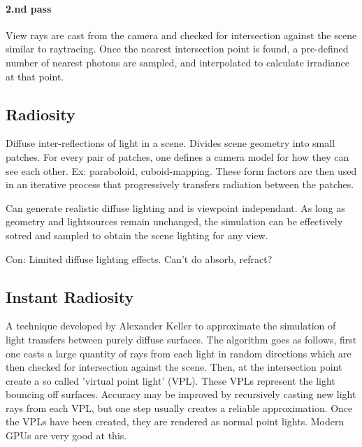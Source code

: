 		\paragraph{2.nd pass} View rays are cast from the camera and checked for intersection against the scene similar to raytracing. Once the nearest intersection point is found, a pre-defined number of nearest photons are sampled, and interpolated to calculate irradiance at that point.

	\subsection {Radiosity}
		Diffuse inter-reflections of light in a scene. Divides scene geometry into small
		patches. For every pair of patches, one defines a camera model for how they can
		see each other. Ex: paraboloid, cuboid-mapping. These form factors are then used
		in an iterative process that progressively transfers radiation between the
		patches.

		Can generate realistic diffuse lighting and is viewpoint independant. As long as
		geometry and lightsources remain unchanged, the simulation can be effectively
		sotred and sampled to obtain the scene lighting for any view.

		Con: Limited diffuse lighting effects. Can't do absorb, refract?

	\subsection {Instant Radiosity}
		A technique developed by Alexander Keller to approximate the simulation of light
		transfers between purely diffuse surfaces. The algorithm goes as follows, first
		one casts a large quantity of rays from each light in random directions which
		are then checked for intersection against the scene. Then, at the intersection
		point create a so called 'virtual point light' (VPL). These VPLs represent the
		light bouncing off surfaces. Accuracy may be improved by recursively casting new
		light rays from each VPL, but one step usually creates a reliable approximation.
		Once the VPLs have been created, they are rendered as normal point lights.
		Modern GPUs are very good at this.

